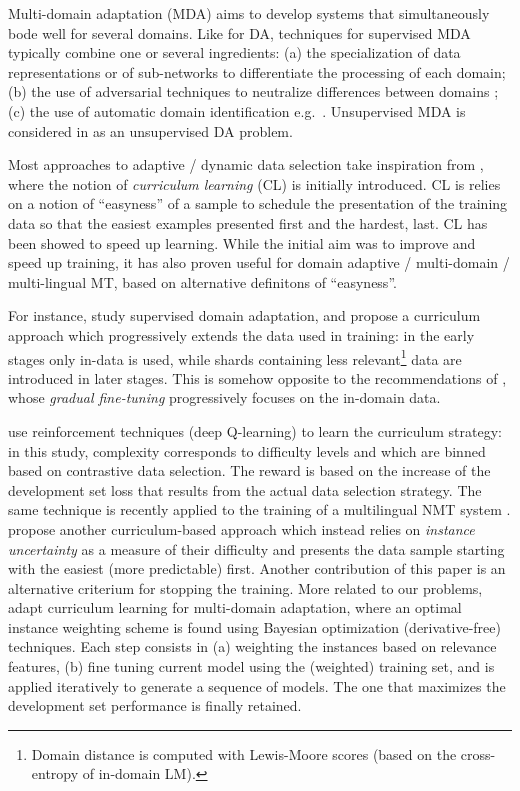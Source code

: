 \documentclass[11pt,a4paper]{article}
\newcommand{\fyTodo}[1]{\Todo[FY:]{\textcolor{orange}{#1}}}
\begin{document}
Multi-domain adaptation (MDA) aims to develop systems that simultaneously bode well for several domains. Like for DA, techniques for supervised MDA typically combine one or several ingredients: (a) the specialization of data representations \citep{Kobus17domaincontrol} or of sub-networks \citep{Pham19generic} to differentiate the processing of each domain; (b) the use of adversarial techniques to neutralize differences between domains \cite{Britz17mixing,Zeng18multidomain}; (c) the use of automatic domain identification e.g.\ \citep{Jiang19multidomain}. Unsupervised MDA is considered in \citep{Farajian17multidomain} as an unsupervised DA problem.

Most approaches to adaptive / dynamic data selection take inspiration from \citep{Bengio09curriculum}, where the notion of \emph{curriculum learning} (CL) is initially introduced. CL is relies on a notion of ``easyness'' of a sample to schedule the presentation of the training data so that the easiest examples  presented first and the hardest, last. CL has been showed to speed up learning. While the initial aim was to improve and speed up training, it has also proven useful for domain adaptive / multi-domain / multi-lingual MT, based on alternative definitons of ``easyness''.

For instance, \citet{Zhang19curriculum} study supervised domain adaptation, and propose a curriculum approach which progressively extends the data used in training: in the early stages only in-data is used, while shards containing less relevant\footnote{Domain distance is computed with Lewis-Moore scores (based on the cross-entropy of in-domain LM).} data are introduced in later stages. This is somehow opposite to the recommendations of \cite{Vanderwees17dynamic}, whose \emph{gradual fine-tuning} progressively focuses on the in-domain data.\fyTodo{These have not been compared ? and also to what we do ?} 

\citet{Kumar19reinforcement} use reinforcement techniques (deep Q-learning) to learn the curriculum strategy: in this study, complexity corresponds to difficulty levels and which are binned based on contrastive data selection. The reward is based on the increase of the development set loss that results from the actual data selection strategy.\fyTodo{Alert: what do we do during warm up ?} The same technique is recently applied to the training of a multilingual NMT system \cite{Kumar21learning}. \citet{Zhou20uncertainty} propose another curriculum-based approach which instead relies on \emph{instance uncertainty} as a measure of their difficulty and presents the data sample starting with the easiest (more predictable) first. Another contribution of this paper is an alternative criterium for stopping the training. More related to our problems, \citet{Wang20learning-multi} adapt curriculum learning for multi-domain adaptation, where an optimal instance weighting scheme is found using Bayesian optimization (derivative-free) techniques. Each step consists in (a) weighting the instances based on relevance features, (b) fine tuning current model using the (weighted) training set, and is applied iteratively to generate a sequence of models. The one that maximizes the development set performance is finally retained.
\end{document}

